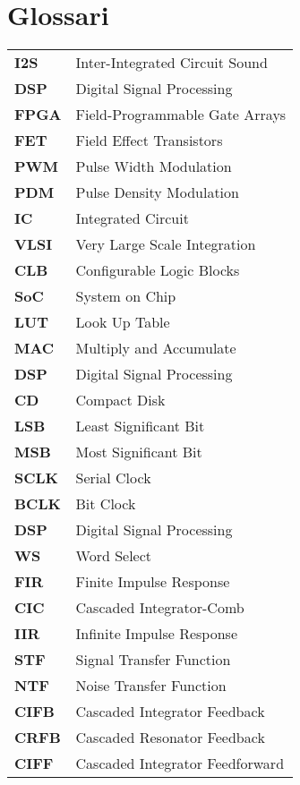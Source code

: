 \tableofcontents
\listoffigures
\listoftables

\chapter*{Glossari}
\begin{longtable}[H]{ll}
\textbf{I2S} & Inter-Integrated Circuit Sound
\\
\textbf{DSP} & Digital Signal Processing
\\
\textbf{FPGA} & Field-Programmable Gate Arrays
\\
\textbf{FET} & Field Effect Transistors
\\
\textbf{PWM} & Pulse Width Modulation
\\
\textbf{PDM} & Pulse Density Modulation
\\
\textbf{IC} & Integrated Circuit
\\
\textbf{VLSI} & Very Large Scale Integration
\\
\textbf{CLB} & Configurable Logic Blocks
\\
\textbf{SoC} & System on Chip
\\
\textbf{LUT} & Look Up Table
\\
\textbf{MAC} & Multiply and Accumulate
\\
\textbf{DSP} & Digital Signal Processing
\\
\textbf{CD} & Compact Disk
\\
\textbf{LSB} & Least Significant Bit
\\
\textbf{MSB} & Most Significant Bit
\\
\textbf{SCLK} & Serial Clock
\\
\textbf{BCLK} & Bit Clock
\\
\textbf{DSP} & Digital Signal Processing
\\
\textbf{WS} & Word Select
\\
\textbf{FIR} & Finite Impulse Response
\\
\textbf{CIC} & Cascaded Integrator-Comb
\\
\textbf{IIR} & Infinite Impulse Response
\\
\textbf{STF} & Signal Transfer Function
\\
\textbf{NTF} & Noise Transfer Function
\\
\textbf{CIFB} & Cascaded Integrator Feedback
\\
\textbf{CRFB} & Cascaded Resonator Feedback
\\
\textbf{CIFF} & Cascaded Integrator Feedforward

\end{longtable}
